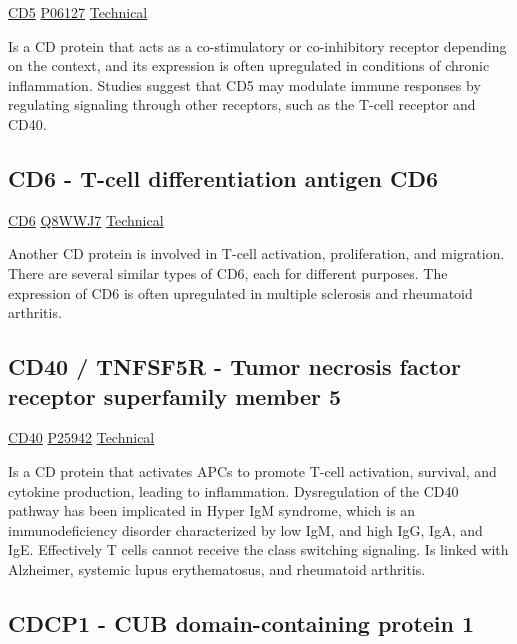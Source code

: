 \href{https://en.wikipedia.org/wiki/CD5_(protein)}{CD5}
\href{http://www.uniprot.org/uniprot/P06127}{P06127}
\href{https://olink.com/products-services/target/protein/?assayID=5106}{Technical}

Is a CD protein that acts as a co-stimulatory or co-inhibitory receptor depending on the context, and its expression is often upregulated in conditions of chronic inflammation. Studies suggest that CD5 may modulate immune responses by regulating signaling through other receptors, such as the T-cell receptor and CD40.

\subsection{CD6 - T-cell differentiation antigen CD6}

\href{https://en.wikipedia.org/wiki/CD6}{CD6}
\href{http://www.uniprot.org/uniprot/Q8WWJ7}{Q8WWJ7}
\href{https://olink.com/products-services/target/protein/?assayID=5038}{Technical}

Another CD protein is involved in T-cell activation, proliferation, and migration. There are several similar types of CD6, each for different purposes. The expression of CD6 is often upregulated in multiple sclerosis and rheumatoid arthritis.

\subsection{CD40 / TNFSF5R - Tumor necrosis factor receptor superfamily member 5}

\href{https://en.wikipedia.org/wiki/CD40_(protein)}{CD40}
\href{http://www.uniprot.org/uniprot/P25942}{P25942}
\href{https://olink.com/products-services/target/protein/?assayID=5108}{Technical}

Is a CD protein that activates APCs to promote T-cell activation, survival, and cytokine production, leading to inflammation. Dysregulation of the CD40 pathway has been implicated in Hyper IgM syndrome, which is an immunodeficiency disorder characterized by low IgM, and high IgG, IgA, and IgE. Effectively T cells cannot receive the class switching signaling. Is linked with Alzheimer, systemic lupus erythematosus, and rheumatoid arthritis.

\subsection{CDCP1 - CUB domain-containing protein 1}

